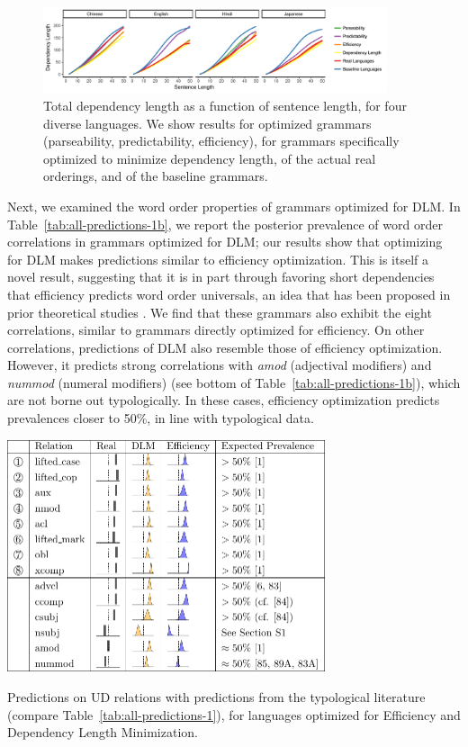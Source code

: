 \documentclass[10pt,twoside,lineno]{article}
\begin{document}
\begin{figure}[ht]
    \centering
	\includegraphics[width=0.9\textwidth]{depLength-facet-1.png} 
        \caption{Total dependency length as a function of sentence length, for four diverse languages. We show results for optimized grammars (parseability, predictability, efficiency), for grammars specifically optimized to minimize dependency length, of the actual real orderings, and of the baseline grammars.}
    \label{fig:dlm-4langs}
\end{figure}


Next, we examined the word order properties of grammars optimized for DLM.
In Table~\ref{tab:all-predictions-1b}, we report the posterior prevalence of word order correlations in grammars optimized for DLM; our results show that optimizing for DLM makes predictions similar to efficiency optimization.
This is itself a novel result, suggesting that it is in part through favoring short dependencies that efficiency predicts word order universals, an idea that has been proposed in prior theoretical studies \citep{hawkins1994performance, hawkins2004efficiency}.
We find that these grammars also exhibit the eight correlations, similar to grammars directly optimized for efficiency.
On other correlations, predictions of DLM also resemble those of efficiency optimization.
However, it predicts strong correlations with \textit{amod} (adjectival modifiers) and \textit{nummod} (numeral modifiers) (see bottom of Table~\ref{tab:all-predictions-1b}), which are not borne out typologically.
In these cases, efficiency optimization predicts prevalences closer to 50\%, in line with typological data.


\begin{table}[ht] 
	\begin{center}	
\includegraphics[width=0.7\textwidth]{si-table-perrel-1b-1.png}
\end{center}
\caption{Predictions on UD relations with predictions from the typological literature (compare Table~\ref{tab:all-predictions-1}), for languages optimized for Efficiency and Dependency Length Minimization.
}
\label{tab:all-predictions-1b}
\end{table}
\end{document}

